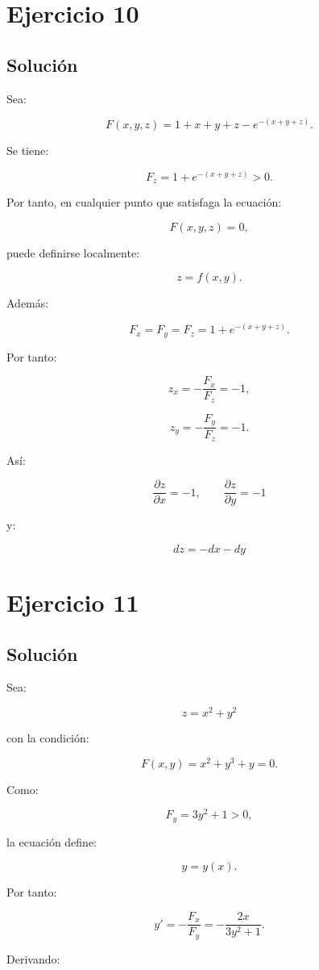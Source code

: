 \documentclass[11pt,a4paper]{article}
\begin{document}
\section{Ejercicio 10}
\subsection{Solución}

Sea:

\[
F(x,y,z)
=
1+x+y+z-e^{-(x+y+z)}.
\]

Se tiene:

\[
F_z
=
1+e^{-(x+y+z)}>0.
\]

Por tanto, en cualquier punto que satisfaga la ecuación:

\[
F(x,y,z)=0,
\]

puede definirse localmente:

\[
z=f(x,y).
\]

Además:

\[
F_x
=
F_y
=
F_z
=
1+e^{-(x+y+z)}.
\]

Por tanto:

\[
z_x
=
-\frac{F_x}{F_z}
=
-1,
\]

\[
z_y
=
-\frac{F_y}{F_z}
=
-1.
\]

Así:

\[
\boxed{
\frac{\partial z}{\partial x}=-1,
\qquad
\frac{\partial z}{\partial y}=-1
}
\]

y:

\[
\boxed{
dz=-dx-dy
}
\]

\section{Ejercicio 11}
\subsection{Solución}

Sea:

\[
z=x^2+y^2
\]

con la condición:

\[
F(x,y)
=
x^2+y^3+y
=
0.
\]

Como:

\[
F_y
=
3y^2+1>0,
\]

la ecuación define:

\[
y=y(x).
\]

Por tanto:

\[
y'
=
-\frac{F_x}{F_y}
=
-\frac{2x}{3y^2+1}.
\]

Derivando:
\end{document}
